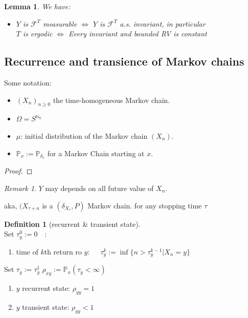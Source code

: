 \documentclass[a4paper,11pt]{book}
\newtheorem{lemma}[theorem]{Lemma}
\theoremstyle{definition}
\newtheorem{definition}{Definition}[section]
\theoremstyle{remark}
\newtheorem*{remark}{Remark}
\begin{document}
 


\begin{lemma} We have:
	\begin{itemize}
		\item $Y$ is $\mathcal{F}^T$ measurable $\Leftrightarrow$ $Y$ is $\mathcal{F}^T$ a.s. invariant, in particular\\
		$T$ is ergodic $\Leftrightarrow$ Every invariant and bounded RV is constant
	\end{itemize}
\end{lemma}



\subsection{Recurrence and transience of Markov chains}
 Some notation:
 \begin{itemize}
 	\item $(X_n)_{n \geq 0}$ the time-homogeneous Markov chain. 
 	\item $\Omega = S^{\mathbb{N}_0}$
 	\item $\mu$: initial distribution of the Markov chain $(X_n)$.
 	\item $\mathbb{P}_x := \mathbb{P}_{\delta_x}$ for a Markov Chain starting at $x$.
 \end{itemize}

 \begin{proof}
 \end{proof}
 \begin{remark}	
 $Y$ may depends on all future value of $X_n$.
 \end{remark}
 
 aka, $(X_{\tau + n}$ is a $(\delta_{X_\tau}, P)$ Markov chain. for any stopping time $\tau$ 

 
 \begin{definition}[recurrent \& transient state]\quad \\
 	Set $\tau_y^0 := 0 \quad$:
 	\begin{enumerate}
 		\item time of $k$th return ro $y: \quad$ $\tau_y^k := \inf \{n > \tau_y^{k-1}| X_n = y\}$
 	\end{enumerate}
Set $\tau_y := \tau_y^1$ $\rho_{xy}:= \mathbb{P}_x(\tau_y < \infty)$
 	\begin{enumerate}
 		\item $y$ recurrent state: $\rho_{yy} = 1$
 		\item $y$ transient state: $\rho_{yy} < 1$
 	\end{enumerate}
 \end{definition}
 
\end{document}
